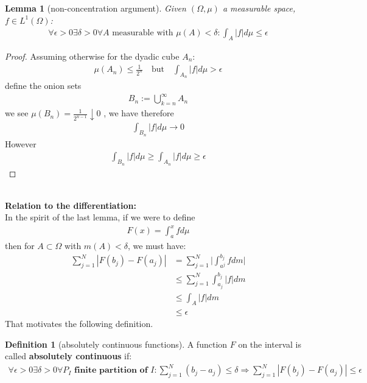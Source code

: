 \documentclass[a4paper,11pt,fleqn]{book}
\newtheorem{lemma}[theorem]{Lemma}
\theoremstyle{definition}
\newtheorem{definition}{Definition}[section]
\theoremstyle{remark}
\begin{document}
\begin{lemma}[non-concentration argument]
	Given $(\Omega, \mu)$ a measurable space, $f \in L^1(\Omega)$:
	\begin{align*}
		\forall \epsilon > 0 \exists \delta > 0 \forall A \text{ measurable with } \mu(A) < \delta : \int_A |f|d\mu \le \epsilon
	\end{align*}
\end{lemma}
\begin{proof}
	Assuming otherwise for the dyadic cube $A_n$:
	\begin{align*}
		\mu(A_n) \le \frac{1}{2^n} \quad
		\text{but} 
		\quad
		\int_{A_n}|f| d\mu > \epsilon
	\end{align*}
	define the onion sets
	\begin{align*}
		B_n := \bigcup_{k = n}^\infty A_n
	\end{align*}
	we see $\mu(B_n) = \frac{1}{2^{n-1}} \downarrow 0$ , we have therefore
	\begin{align*}
		\int_{B_n} |f| d\mu \rightarrow 0
	\end{align*}
	However
	\begin{align*}
		\int_{B_n} |f|d\mu \geq \int_{A_n}|f|d\mu \ge \epsilon 
	\end{align*}
\end{proof}

\quad\\
\textbf{Relation to the differentiation:}\\
In the spirit of the last lemma, if we were to define
\begin{align*}
	F(x) = \int_a^x f d\mu
\end{align*}
then for $A \subset \Omega$ with $m(A) < \delta$, we must have:
\begin{align*}
	\sum_{j = 1}^N |F(b_j) - F(a_j)| &= \sum_{j = 1}^N \bigg|\int_{a^j}^{b_j}fdm\bigg|\\
	&\le \sum_{j = 1}^N\int_{a_j}^{b_j}|f|dm\\
	&\le \int_A|f|dm \\
	&\le \epsilon
\end{align*}
That motivates the following definition. 

\begin{definition}[absolutely continuous functions]
	A function $F$ on the interval is called \textbf{absolutely continuous} if:
	\begin{align*}
		\forall \epsilon > 0 \exists \delta > 0 \forall P_I  \textbf{  finite partition of $I$}: \sum_{j = 1}^N (b_j - a_j) \leq \delta \Rightarrow \sum_{j = 1}^N |F(b_j) - F(a_j)| \leq \epsilon
	\end{align*}
\end{definition}
\end{document}

